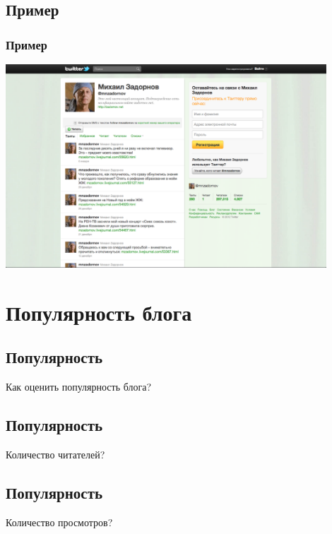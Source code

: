\documentclass[compress,red]{beamer}
\begin{document}
\subsection{Пример}
\begin{frame}
  \frametitle{Пример}
	\centerline{\includegraphics[width=0.9\textwidth]{images/twitter-mzadornov.png}}
\end{frame}

\section{Популярность блога}
\subsection{Популярность}
\begin{frame}
	\begin{center}
	\Huge{Как оценить популярность блога?}
	\end{center}
\end{frame}

\subsection{Популярность}
\begin{frame}
	\begin{center}
	\Large{Количество читателей?}
	\end{center}
\end{frame}

\subsection{Популярность}
\begin{frame}
	\begin{center}
	\Large{Количество просмотров?}
	\end{center}
\end{frame}
\end{document}
